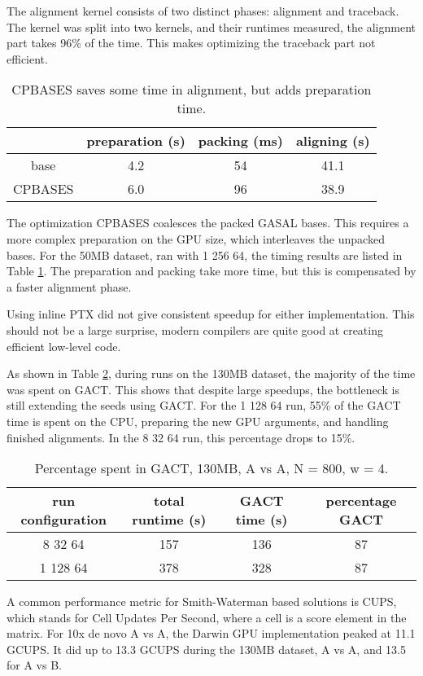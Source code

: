 \documentclass[../thesis.tex]{subfiles}
\begin{document}
The alignment kernel consists of two distinct phases: alignment and traceback.
The kernel was split into two kernels, and their runtimes measured, the alignment part takes 96\% of the time.
This makes optimizing the traceback part not efficient.

\begin{table}
\centering
\caption{CPBASES saves some time in alignment, but adds preparation time.}
\label{tbl:CPBASES}
\begin{tabular}{c c c c}
& preparation (s) & packing (ms) & aligning (s) \\ \hline
base & 4.2 & 54 & 41.1 \\
CPBASES & 6.0 & 96 & 38.9 \\
\end{tabular}
\end{table}

The optimization CPBASES coalesces the packed GASAL bases.
This requires a more complex preparation on the GPU size, which interleaves the unpacked bases.
For the 50MB dataset, ran with 1 256 64, the timing results are listed in Table \ref{tbl:CPBASES}.
The preparation and packing take more time, but this is compensated by a faster alignment phase.

Using inline PTX did not give consistent speedup for either implementation.
This should not be a large surprise, modern compilers are quite good at creating efficient low-level code.

As shown in Table \ref{tbl:darwin7}, during runs on the 130MB dataset, the majority of the time was spent on GACT.
This shows that despite large speedups, the bottleneck is still extending the seeds using GACT.
For the 1 128 64 run, 55\% of the GACT time is spent on the CPU, preparing the new GPU arguments, and handling finished alignments.
In the 8 32 64 run, this percentage drops to 15\%.
\begin{table}
\centering
\caption{Percentage spent in GACT, 130MB, A vs A, N = 800, w = 4.}
\label{tbl:darwin7}
\begin{tabular}{c|c c c}
run configuration & total runtime (s) & GACT time (s) & percentage GACT \\ \hline
8 32 64 & 157 & 136 & 87 \\
1 128 64 & 378 & 328 & 87 \\
\end{tabular}
\end{table}


A common performance metric for Smith-Waterman based solutions is CUPS, which stands for Cell Updates Per Second, where a cell is a score element in the matrix.
For 10x de novo A vs A, the Darwin GPU implementation peaked at 11.1 GCUPS.
It did up to 13.3 GCUPS during the 130MB dataset, A vs A, and 13.5 for A vs B.
\end{document}
